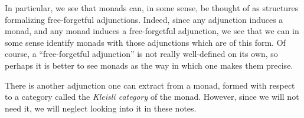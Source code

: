 \begin{remark}
	In particular, we see that monads can, in some sense, be thought of as structures formalizing free-forgetful adjunctions. Indeed, since any adjunction induces a monad,
	and any monad induces a free-forgetful adjunction, we see that we can in some sense identify monads with those adjunctions which are of this form. Of course, a
	``free-forgetful adjunction'' is not really well-defined on its own, so perhaps it is better to see monads as the way in which one makes them precise.
\end{remark}
\begin{remark}
	There is another adjunction one can extract from a monad, formed with respect to a category called the \emph{Kleisli category} of the monad. However, since we will not need it,
	we will neglect looking into it in these notes.
\end{remark}

